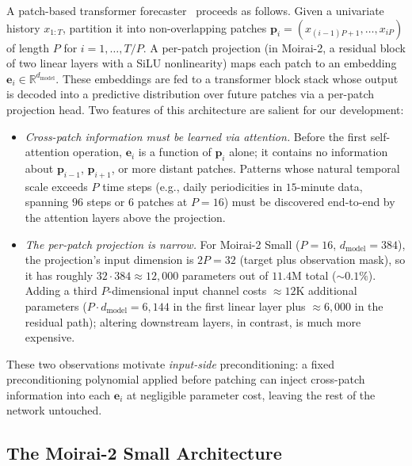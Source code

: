 \documentclass[11pt]{article}
\theoremstyle{plain}
\theoremstyle{definition}
\theoremstyle{remark}
\newcommand{\R}{\mathbb{R}}
\begin{document}
A patch-based transformer forecaster~\citep{nie2023patchtst, woo2024unified, liu2024moirai2} proceeds as follows. Given a univariate history $x_{1:T}$, partition it into non-overlapping patches $\mathbf{p}_i = (x_{(i-1)P+1}, \ldots, x_{iP})$ of length $P$ for $i=1, \ldots, T/P$. A per-patch projection (in Moirai-2, a residual block of two linear layers with a SiLU nonlinearity) maps each patch to an embedding $\mathbf{e}_i \in \R^{d_{\text{model}}}$. These embeddings are fed to a transformer block stack whose output is decoded into a predictive distribution over future patches via a per-patch projection head. Two features of this architecture are salient for our development:
\begin{itemize}[leftmargin=1.5em, itemsep=0.1em, topsep=0.2em]
    \item \emph{Cross-patch information must be learned via attention.} Before the first self-attention operation, $\mathbf{e}_i$ is a function of $\mathbf{p}_i$ alone; it contains no information about $\mathbf{p}_{i-1}$, $\mathbf{p}_{i+1}$, or more distant patches. Patterns whose natural temporal scale exceeds $P$ time steps (e.g., daily periodicities in $15$-minute data, spanning $96$ steps or $6$ patches at $P=16$) must be discovered end-to-end by the attention layers above the projection.
    \item \emph{The per-patch projection is narrow.} For Moirai-2 Small ($P=16$, $d_{\text{model}}=384$), the projection's input dimension is $2P = 32$ (target plus observation mask), so it has roughly $32 \cdot 384 \approx 12{,}000$ parameters out of $11.4$M total ($\sim 0.1\%$). Adding a third $P$-dimensional input channel costs $\approx 12$K additional parameters ($P \cdot d_{\text{model}} = 6{,}144$ in the first linear layer plus $\approx 6{,}000$ in the residual path); altering downstream layers, in contrast, is much more expensive.
\end{itemize}
These two observations motivate \emph{input-side} preconditioning: a fixed preconditioning polynomial applied before patching can inject cross-patch information into each $\mathbf{e}_i$ at negligible parameter cost, leaving the rest of the network untouched.

\subsection{The Moirai-2 Small Architecture}
\label{sec:moirai-arch}
\end{document}
